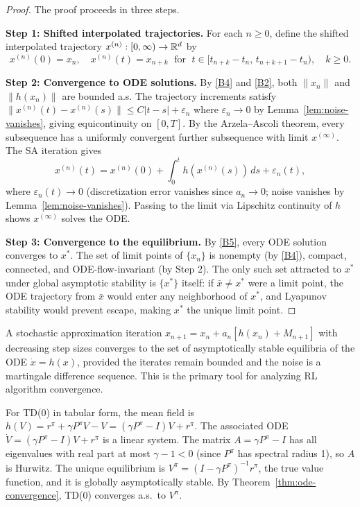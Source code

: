\documentclass[11pt,a4paper]{article}
\begin{document}
\begin{proof}
The proof proceeds in three steps.

\medskip
\noindent\textbf{Step 1: Shifted interpolated trajectories.}
For each $n \geq 0$, define the shifted interpolated trajectory
$x^{(n)} : [0,\infty) \to \mathbb{R}^d$ by
\[
  x^{(n)}(0) = x_n, \quad
  x^{(n)}(t) = x_{n+k} \;\text{ for }\;
    t \in [t_{n+k} - t_n,\, t_{n+k+1} - t_n),
  \quad k \geq 0.
\]

\medskip
\noindent\textbf{Step 2: Convergence to ODE solutions.}
By \ref{B4} and \ref{B2}, both $\|x_n\|$ and $\|h(x_n)\|$ are
bounded a.s. The trajectory increments satisfy
$\|x^{(n)}(t) - x^{(n)}(s)\| \leq C|t-s| + \varepsilon_n$ where
$\varepsilon_n \to 0$ by Lemma~\ref{lem:noise-vanishes}, giving
equicontinuity on $[0,T]$. By the Arzela--Ascoli theorem, every
subsequence has a uniformly convergent further subsequence with
limit $x^{(\infty)}$. The SA iteration gives
\[
  x^{(n)}(t) = x^{(n)}(0)
    + \int_0^t h(x^{(n)}(s))\,ds + \varepsilon_n(t),
\]
where $\varepsilon_n(t) \to 0$ (discretization error vanishes since
$a_n \to 0$; noise vanishes by Lemma~\ref{lem:noise-vanishes}).
Passing to the limit via Lipschitz continuity of $h$ shows
$x^{(\infty)}$ solves the ODE.

\medskip
\noindent\textbf{Step 3: Convergence to the equilibrium.}
By \ref{B5}, every ODE solution converges to $x^*$. The set of limit
points of $\{x_n\}$ is nonempty (by \ref{B4}), compact, connected,
and ODE-flow-invariant (by Step 2). The only such set attracted to
$x^*$ under global asymptotic stability is $\{x^*\}$ itself: if
$\bar{x} \neq x^*$ were a limit point, the ODE trajectory from
$\bar{x}$ would enter any neighborhood of $x^*$, and Lyapunov
stability would prevent escape, making $x^*$ the unique limit point.
\end{proof}

\begin{keyresult}[title={The ODE Method}]
A stochastic approximation iteration
$x_{n+1} = x_n + a_n[h(x_n) + M_{n+1}]$ with decreasing step
sizes converges to the set of asymptotically stable equilibria of
the ODE $\dot{x} = h(x)$, provided the iterates remain bounded
and the noise is a martingale difference sequence. This is the
primary tool for analyzing RL algorithm convergence.
\end{keyresult}

\begin{rlconnection}[title={TD(0) via the ODE Method}]
For TD(0) in tabular form, the mean field is
$h(V) = r^\pi + \gamma P^\pi V - V = (\gamma P^\pi - I)V + r^\pi$.
The associated ODE $\dot{V} = (\gamma P^\pi - I)V + r^\pi$ is a
linear system. The matrix $A = \gamma P^\pi - I$ has all eigenvalues
with real part at most $\gamma - 1 < 0$ (since $P^\pi$ has spectral
radius 1), so $A$ is Hurwitz. The unique equilibrium is
$V^\pi = (I - \gamma P^\pi)^{-1} r^\pi$, the true value function,
and it is globally asymptotically stable. By
Theorem~\ref{thm:ode-convergence}, TD(0) converges a.s.\ to
$V^\pi$.
\end{rlconnection}
\end{document}
